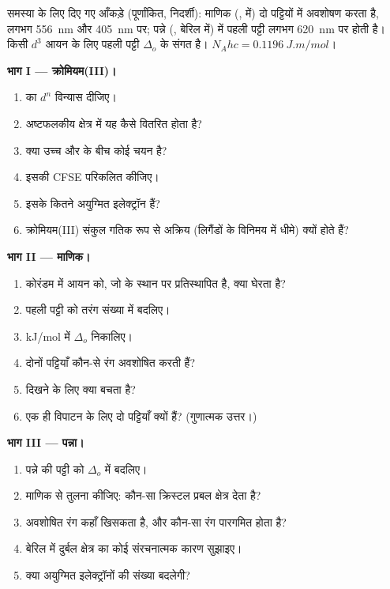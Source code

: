 \begin{problem}
\label{pb:b2:ligand-field:1}
समस्या के लिए दिए गए आँकड़े (पूर्णांकित, निदर्शी): माणिक (,  में) दो पट्टियों में
अवशोषण करता है, लगभग \qty{556}{nm} और \qty{405}{nm} पर; पन्ने (, बेरिल में) में
पहली पट्टी लगभग \qty{620}{nm} पर होती है। किसी $d^3$ आयन के लिए पहली पट्टी
$\Delta_o$ के संगत है। $N_Ahc = \qty{0.1196}{J.m/mol}$।

\medskip
\noindent\textbf{भाग I --- क्रोमियम(III)।}
\begin{enumerate}
  \item {} का $d^n$ विन्यास दीजिए।
  \item अष्टफलकीय क्षेत्र में यह कैसे वितरित होता है?
  \item क्या उच्च और  के बीच कोई चयन है?
  \item इसकी CFSE परिकलित कीजिए।
  \item इसके कितने अयुग्मित इलेक्ट्रॉन हैं?
  \item क्रोमियम(III) संकुल गतिक रूप से अक्रिय (लिगैंडों के विनिमय में धीमे) क्यों होते हैं?
\end{enumerate}

\medskip
\noindent\textbf{भाग II --- माणिक।}
\begin{enumerate}[resume]
  \item कोरंडम में  आयन को, जो  के स्थान पर प्रतिस्थापित है, क्या घेरता है?
  \item पहली पट्टी को तरंग संख्या में बदलिए।
  \item \unit{kJ/mol} में $\Delta_o$ निकालिए।
  \item दोनों पट्टियाँ कौन-से रंग अवशोषित करती हैं?
  \item दिखने के लिए क्या बचता है?
  \item एक ही विपाटन के लिए दो पट्टियाँ क्यों हैं? (गुणात्मक उत्तर।)
\end{enumerate}

\medskip
\noindent\textbf{भाग III --- पन्ना।}
\begin{enumerate}[resume]
  \item पन्ने की पट्टी को $\Delta_o$ में बदलिए।
  \item माणिक से तुलना कीजिए: कौन-सा क्रिस्टल प्रबल क्षेत्र देता है?
  \item अवशोषित रंग कहाँ खिसकता है, और कौन-सा रंग पारगमित होता है?
  \item बेरिल में दुर्बल क्षेत्र का कोई संरचनात्मक कारण सुझाइए।
  \item क्या अयुग्मित इलेक्ट्रॉनों की संख्या बदलेगी?
\end{enumerate}


\end{problem}
